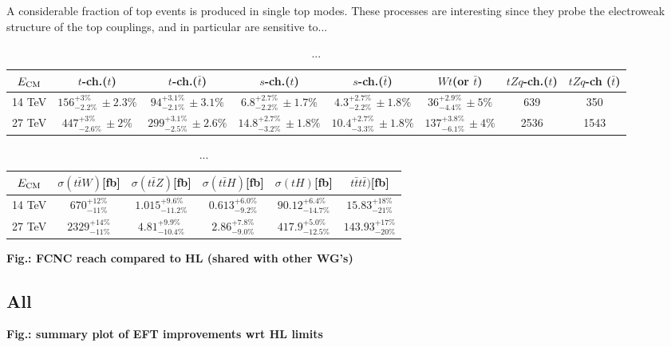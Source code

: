 \documentclass{article}
\begin{document}
\vskip 0.3cm
A considerable fraction of top events is produced in single top modes. These processes
are interesting since they probe the electroweak structure of the top couplings, and
in particular are sensitive to...

\begin{table}[htb]
\caption{...}
\label{tab:singlet_yields}
\hskip-3.0cm
\begin{tabular} {|c |c  |c  |c  |c |c | c |c |}
  \hline
  $E_{\rm CM}$ & $t$-ch.($t$)   &  $t$-ch.($\bar{t}$)   &   $s$-ch.($t$) &  $s$-ch.($\bar{t}$)   &  $Wt$(or $\bar{t}$) & $tZq$-ch.($t$) & $tZq$-ch ($\bar{t}$) \\
  \hline
  14 TeV     &  $156^{+3\%}_{-2.2\%} {\scriptstyle \,\pm 2.3\%}$& $94^{+3.1\%}_{-2.1\%}{\scriptstyle\,\pm 3.1\% } $  & $6.8^{+2.7\%}_{-2.2\%}\scriptstyle\,\pm 1.7\%$    &  $4.3^{+2.7\%}_{-2.2\%}\scriptstyle\,\pm 1.8\% $       &   $36^{+2.9\%}_{-4.4\%}{\scriptstyle\,\pm 5\%}$   & 639  & 350    \\
  \hline
  27 TeV     &  $447^{+3\%}_{-2.6\%}{\scriptstyle \, \pm 2\%}$  & $299^{+3.1\%}_{-2.5\%}{\scriptstyle\,\pm 2.6\%} $  & $14.8^{+2.7\%}_{-3.2\%}{\scriptstyle\, \pm 1.8\%} $ & $10.4^{+2.7\%}_{-3.3\%}{\scriptstyle\,\pm 1.8\%} $       & $137^{+3.8\%}_{-6.1\%}{\scriptstyle\,\pm 4\%} $  &  2536 & 1543 \\
  \hline
\end{tabular}
\end{table}
\vskip 0.3cm

\begin{table}[htb]
\caption{...}
\label{tab:singlet_yields}
\begin{tabular} {|c |c   |c |c  |c  |c  |}
  \hline
  $E_{\rm CM}$     & $\sigma(t\bar{t}W)$[fb]         & $\sigma(t\bar{t}Z)$[fb]               & $\sigma(t\bar{t}H)$[fb]           & $\sigma(t H)$[fb]                  & $t\bar{t}t\bar{t})$[fb]      \\
  \hline
  14 TeV         & $670^{+12\%}_{-11\%}$  &  $1.015^{+9.6\%}_{-11.2\%}$   & $0.613^{+6.0\%}_{-9.2\%}$ & $90.12^{+6.4\%}_{-14.7\%}$ & $15.83^{+18\%}_{-21\%}$    \\
  \hline 
  27 TeV         & $2329^{+14\%}_{-11\%}$ &  $4.81 ^{+9.9\%}_{-10.4\%}$   & $2.86^{+7.8\%}_{-9.0\%}$  & $417.9^{+5.0\%}_{-12.5\%}$ & $143.93 ^{+17\%}_{-20\%}$  \\
  \hline
\end{tabular} 
\end{table}


\vskip 1cm
{\bf Fig.: FCNC reach compared to HL (shared with other WG's)}


\subsection{All}

{\bf Fig.: summary plot of EFT improvements wrt HL limits}


{}
\end{document}
